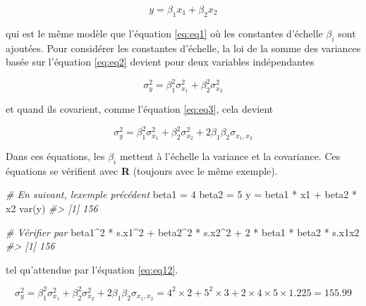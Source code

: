 \documentclass[
]{book}
\newenvironment{Shaded}{}{}
\newcommand{\CommentTok}[1]{\textit{#1}}
\newcommand{\DecValTok}[1]{#1}
\newcommand{\FunctionTok}[1]{#1}
\newcommand{\NormalTok}[1]{#1}
\newcommand{\OtherTok}[1]{#1}
\newcommand{\SpecialCharTok}[1]{#1}
\begin{document}
\begin{equation}
y=\beta_1 x_1+\beta_2 x_2
\label{eq:eq9}
\end{equation}

qui est le même modèle que l'équation \eqref{eq:eq1} où les constantes d'échelle \(\beta_i\) sont ajoutées. Pour considérer les constantes d'échelle, la loi de la somme des variances basée sur l'équation \eqref{eq:eq2} devient pour deux variables indépendantes

\[
\sigma_y^2=\beta_1^2 \sigma_{x_1}^2+\beta_2^2 \sigma_{x_2}^2
\]

et quand ils covarient, comme l'équation \eqref{eq:eq3}, cela devient

\begin{equation}
\sigma_y^2=\beta_1^2 \sigma_{x_1}^2+\beta_2^2 \sigma_{x_2}^2+2\beta_1 \beta_2 \sigma_{x_1,x_2}
\label{eq:eq11}
\end{equation}

Dans ces équations, les \(\beta_i\) mettent à l'échelle la variance et la covariance. Ces équations se vérifient avec \textbf{R} (toujours avec le même exemple).

\begin{Shaded}
\begin{Highlighting}[]
\CommentTok{\# En suivant, l\textquotesingle{}exemple précédent}
\NormalTok{beta1 }\OtherTok{=} \DecValTok{4}
\NormalTok{beta2 }\OtherTok{=} \DecValTok{5}
\NormalTok{y }\OtherTok{=}\NormalTok{ beta1 }\SpecialCharTok{*}\NormalTok{ x1 }\SpecialCharTok{+}\NormalTok{ beta2 }\SpecialCharTok{*}\NormalTok{ x2}
\FunctionTok{var}\NormalTok{(y) }
\CommentTok{\#\textgreater{} [1] 156}

\CommentTok{\# Vérifier par}
\NormalTok{beta1}\SpecialCharTok{\^{}}\DecValTok{2} \SpecialCharTok{*}\NormalTok{ s.x1}\SpecialCharTok{\^{}}\DecValTok{2} \SpecialCharTok{+}\NormalTok{ beta2}\SpecialCharTok{\^{}}\DecValTok{2} \SpecialCharTok{*}\NormalTok{ s.x2}\SpecialCharTok{\^{}}\DecValTok{2} \SpecialCharTok{+} \DecValTok{2} \SpecialCharTok{*}\NormalTok{ beta1 }\SpecialCharTok{*}\NormalTok{ beta2 }\SpecialCharTok{*}\NormalTok{ s.x1x2 }
\CommentTok{\#\textgreater{} [1] 156}
\end{Highlighting}
\end{Shaded}

tel qu'attendue par l'équation \eqref{eq:eq12}.

\[
\sigma_y^2=\beta_1^2 \sigma_{x_1}^2+\beta_2^2 \sigma_{x_2}^2+2\beta_1 \beta_2 \sigma_{x_1,x_2} =
4^2 \times 2 + 5^2 \times 3 + 2 \times 4 \times 5 \times 1.225 = 155.99
\]
\end{document}
